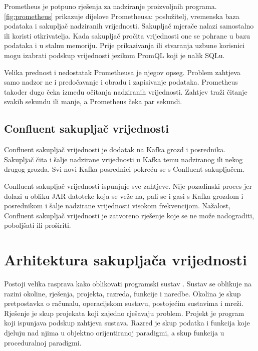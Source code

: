 \documentclass[utf8, diplomski, lmodern, numeric]{fer}
\begin{document}
Prometheus \citep{prometheus} je potpuno rješenja za nadziranje proizvoljnih programa. \ref{fig:prometheus} prikazuje dijelove Prometheusa: poslužitelj, vremenska baza podataka i sakupljač nadziranih vrijednosti. Sakupljač mjerače nalazi samostalno ili koristi otkrivatelja. Kada sakupljač pročita vrijednosti one se pohrane u bazu podataka i u stalnu memoriju. Prije prikazivanja ili stvaranja uzbune korisnici mogu izabrati podskup vrijednosti jezikom PromQL koji je nalik SQLu.

Velika prednost i nedostatak Prometheusa je njegov opseg. Problem zahtjeva samo nadzor ne i predočavanje i obradu i zapisivanje podataka. Prometheus također dugo čeka između očitanja nadziranih vrijednosti. Zahtjev traži čitanje svakih sekundu ili manje, a Prometheus čeka par sekundi.


\section{Confluent sakupljač vrijednosti}

Confluent sakupljač vrijednosti \citep{confluent-metrics-reporter} je dodatak na Kafka grozd i posrednika. Sakupljač čita i šalje nadzirane vrijednosti u Kafka temu nadziranog ili nekog drugog grozda. Svi novi Kafka posrednici pokreću se s Confluent sakupljačem.

Confluent sakupljač vrijednosti ispunjuje sve zahtjeve. Nije pozadinski proces jer dolazi u obliku JAR datoteke koja se veže na, pali se i gasi s Kafka grozdom i posrednikom i šalje nadzirane vrijednosti visokom frekvencijom. Nažalost, Confluent sakupljač vrijednosti je zatvoreno rješenje koje se ne može nadograditi, poboljšati ili proširiti.



\chapter{Arhitektura sakupljača vrijednosti}

Postoji velika rasprava kako oblikovati programski sustav \citep{clean-code} \citep{code-complete}. Sustav se oblikuje na razini okoline, rješenja, projekta, razreda, funkcije i naredbe. Okolina je skup pretpostavka o računalu, operacijskom sustavu, postojećim sustavima i mreži. Rješenje je skup projekata koji zajedno rješavaju problem. Projekt je program koji ispunjava podskup zahtjeva sustava. Razred je skup podatka i funkcija koje djeluju nad njima u objektno orijentiranoj paradigmi, a skup funkcija u proceduralnoj paradigmi.
\end{document}

